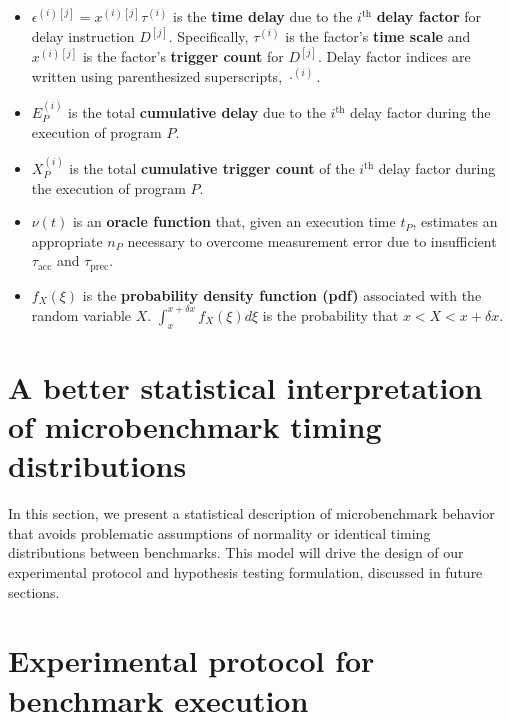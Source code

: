 \documentclass[conference]{IEEEtran}
\begin{document}
\begin{itemize}
    \item
    $\epsilon^{(i)[j]} = x^{(i)[j]} \tau^{(i)}$ is the \textbf{time delay} due to the
    $i^{\textrm{th}}$ \textbf{delay factor} for delay instruction $D^{[j]}$.  Specifically,
    $\tau^{(i)}$ is the factor's \textbf{time scale} and $x^{(i)[j]}$ is the factor's
    \textbf{trigger count} for $D^{[j]}$. Delay factor indices are written using
    parenthesized superscripts, $\cdot^{(i)}$.

    \item
    $E_P^{(i)}$ is the total \textbf{cumulative delay} due to the $i^{\textrm{th}}$ delay
    factor during the execution of program $P$.

    \item
    $X^{(i)}_P$ is the total \textbf{cumulative trigger count} of the $i^{\textrm{th}}$
    delay factor during the execution of program $P$.

    \item
    $\nu(t)$ is an \textbf{oracle function} that, given an execution time $t_P$, estimates
    an appropriate $n_P$ necessary to overcome measurement error due to insufficient
    $\tau_{\textrm{acc}}$ and $\tau_{\textrm{prec}}$.

    \item
    $f_X(\xi)$ is the \textbf{probability density function (pdf)} associated with the random
    variable $X$. $\int_{x}^{x+\delta x} f_X(\xi) d\xi$ is the probability that $x < X <
    x+\delta x$.
\end{itemize}


\label{sec:model}
\section{A better statistical interpretation of microbenchmark timing distributions}

In this section, we present a statistical description of microbenchmark behavior that avoids
problematic assumptions of normality or identical timing distributions between benchmarks.
This model will drive the design of our experimental protocol and hypothesis testing
formulation, discussed in future sections.

\label{sec:protocol}
\section{Experimental protocol for benchmark execution}
\end{document}
